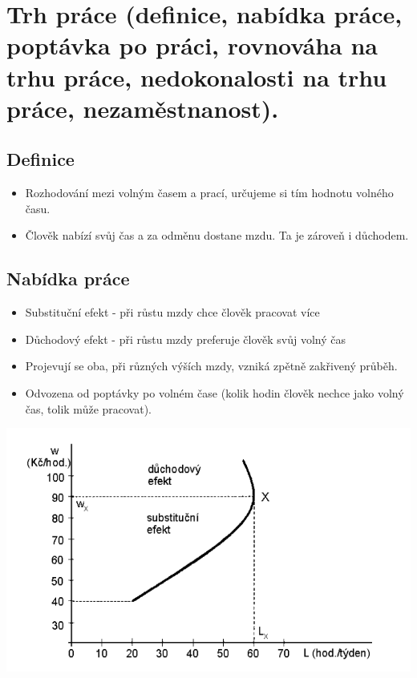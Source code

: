 \clearpage
\section{Trh práce (definice, nabídka práce, poptávka po práci, rovnováha na trhu práce,
nedokonalosti na trhu práce, nezaměstnanost).}

\subsection{Definice}
\begin{itemize}
    \item Rozhodování mezi volným časem a prací, určujeme si tím hodnotu volného času.
    \item Člověk nabízí svůj čas a za odměnu dostane mzdu. Ta je zároveň i důchodem.
\end{itemize}

\subsection{Nabídka práce}
\begin{itemize}
    \item Substituční efekt - při růstu mzdy chce člověk pracovat více
    \item Důchodový efekt - při růstu mzdy preferuje člověk svůj volný čas
    \item Projevují se oba, při různých výších mzdy, vzniká zpětně zakřivený průběh.
    \item Odvozena od poptávky po volném čase (kolik hodin člověk nechce jako volný čas, 
    tolik může pracovat).
\end{itemize}
\includegraphics[width=16cm]{images/17_subs_duch_ef.png}

